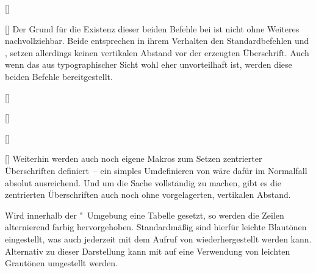 \begin{Bundle*}{}
\begin{Declaration}{%
  []%
}
\begin{Declaration}{%
  []%
}
\printdeclarationlist%
%
Der Grund für die Existenz dieser beiden Befehle bei  ist 
nicht ohne Weiteres nachvollziehbar. Beide entsprechen in ihrem Verhalten den 
Standardbefehlen  und , setzen allerdings 
keinen vertikalen Abstand vor der erzeugten Überschrift. Auch wenn das aus 
typographischer Sicht wohl eher unvorteilhaft ist, werden diese beiden Befehle 
bereitgestellt.
\end{Declaration}
\end{Declaration}

\begin{Declaration}{%
  []%
}
\begin{Declaration}{%
  []%
}
\begin{Declaration}{%
  []%
}
\begin{Declaration}{%
  []%
}
\printdeclarationlist%
%
Weiterhin werden auch noch eigene Makros zum Setzen zentrierter Überschriften 
definiert~-- ein simples Umdefinieren von  wäre dafür im 
Normalfall absolut ausreichend. Und um die Sache vollständig zu machen, gibt es 
die zentrierten Überschriften auch noch ohne vorgelagerten, vertikalen Abstand.
\end{Declaration}
\end{Declaration}
\end{Declaration}
\end{Declaration}

\begin{Declaration}{}
\begin{Declaration}{}
\begin{Declaration}{}
\printdeclarationlist%
%
Wird innerhalb der "~Umgebung eine Tabelle gesetzt, 
so werden die Zeilen alternierend farbig hervorgehoben. Standardmäßig sind 
hierfür leichte Blautönen eingestellt, was auch jederzeit mit dem Aufruf von 
 wiederhergestellt werden kann. Alternativ zu dieser 
Darstellung kann mit  auf eine Verwendung von leichten 
Grautönen umgestellt werden.
\end{Declaration}
\end{Declaration}
\end{Declaration}


\end{Bundle*}
